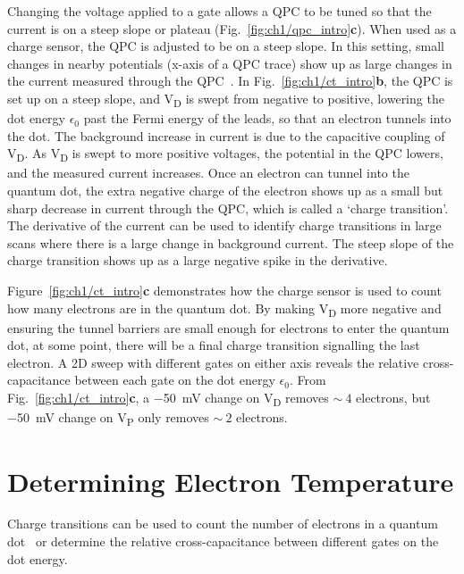 Changing the voltage applied to a gate allows a QPC to be tuned so that the current is on a steep slope or plateau (Fig.~\ref{fig:ch1/qpc_intro}\textbf{c}). When used as a charge sensor, the QPC is adjusted to be on a steep slope. In this setting, small changes in nearby potentials (x-axis of a QPC trace) show up as large changes in the current measured through the QPC~\cite{cs_design}. In Fig.~\ref{fig:ch1/ct_intro}\textbf{b}, the QPC is set up on a steep slope, and V\textsubscript{D} is swept from negative to positive, lowering the dot energy $\epsilon_0$ past the Fermi energy of the leads, so that an electron tunnels into the dot. The background increase in current is due to the capacitive coupling of V\textsubscript{D}. As V\textsubscript{D} is swept to more positive voltages, the potential in the QPC lowers, and the measured current increases. Once an electron can tunnel into the quantum dot, the extra negative charge of the electron shows up as a small but sharp decrease in current through the QPC, which is called a `charge transition'. The derivative of the current can be used to identify charge transitions in large scans where there is a large change in background current. The steep slope of the charge transition shows up as a large negative spike in the derivative. 

Figure~\ref{fig:ch1/ct_intro}\textbf{c} demonstrates how the charge sensor is used to count how many electrons are in the quantum dot. By making V\textsubscript{D} more negative and ensuring the tunnel barriers are small enough for electrons to enter the quantum dot, at some point, there will be a final charge transition signalling the last electron. A 2D sweep with different gates on either axis reveals the relative cross-capacitance between each gate on the dot energy $\epsilon_0$. From Fig.~\ref{fig:ch1/ct_intro}\textbf{c}, a \qty{-50}{mV} change on V\textsubscript{D} removes $\sim~4$ electrons, but \qty{-50}{mV} change on V\textsubscript{P} only removes $\sim~2$ electrons.



\section{Determining Electron Temperature}



Charge transitions can be used to count the number of electrons in a quantum dot~\cite{electron_counting} or determine the relative cross-capacitance between different gates on the dot energy.

